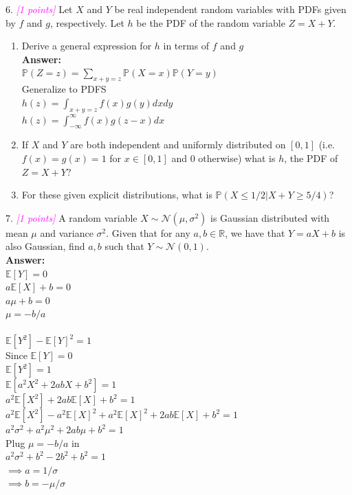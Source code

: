 \documentclass{article}
\newcommand{\field}[1]{\mathbb{#1}}
\newcommand{\1}{\mathbf{1}}
\renewcommand{\P}{\mathbb{P}}
\newcommand{\R}{\field{R}} %
\newcommand{\ProbOpr}[1]{\mathbb{#1}}
\newcommand{\grade}[1]{\small\textcolor{magenta}{\emph{[#1 points]}} \normalsize}
\begin{document}
6. \grade{1} Let $X$ and $Y$ be real independent random variables with PDFs given by $f$ and $g$, respectively. Let $h$ be the PDF of the random variable $Z = X+Y$.
\begin{enumerate}
	\item Derive a general expression for $h$ in terms of $f$ and $g$\\
	\textbf{Answer:}\\
	$\P(Z=z)=\sum_{x+y=z} \P(X=x)\P(Y=y)$\\
	Generalize to PDFS\\
	$h(z)=\int_{x+y=z} f(x)g(y)dxdy$\\
	$h(z)=\int_{-\infty}^{\infty} f(x)g(z-x)dx$\\
	
	\item If $X$ and $Y$ are both independent and uniformly distributed on $[0,1]$ (i.e. $f(x)=g(x)=1$ for $x \in [0,1]$ and $0$ otherwise) what is $h$, the PDF of $Z=X+Y$?
	\item For these given explicit distributions, what is $\P(X \leq 1/2 | X+Y\geq 5/4)$?
\end{enumerate}

7. \grade{1} A random variable $X \sim \mathcal{N}(\mu, \sigma^2)$ is Gaussian distributed with mean $\mu$ and variance $\sigma^2$. Given that for any $a,b \in \R$, we have that $Y = aX + b$ is also Gaussian, find $a,b$ such that $Y \sim \mathcal{N}(0,1)$.\\
\textbf{Answer:}\\
$\ProbOpr{E}[Y]=0$\\
$a \ProbOpr{E}[X]+b=0$\\
$a\mu+b=0$\\
$\mu=-b/a$\\
\\
$\ProbOpr{E}[Y^2]-\ProbOpr{E}[Y]^2=1$\\
Since $\ProbOpr{E}[Y]=0$\\
$\ProbOpr{E}[Y^2]=1$\\
$\ProbOpr{E}[a^2 X^2+2abX+b^2]=1$\\
$a^2 \ProbOpr{E}[X^2]+2ab\ProbOpr{E}[X]+b^2=1$\\
$a^2 \ProbOpr{E}[X^2]-a^2\ProbOpr{E}[X]^2+a^2\ProbOpr{E}[X]^2+2ab\ProbOpr{E}[X]+b^2=1$\\
$a^2 \sigma^2+a^2\mu^2+2ab\mu+b^2=1$\\
Plug $\mu=-b/a$ in\\
$a^2 \sigma^2+b^2-2b^2+b^2=1$\\
$\implies a=1/\sigma$\\
$\implies b=-\mu/\sigma$\\
\end{document}
